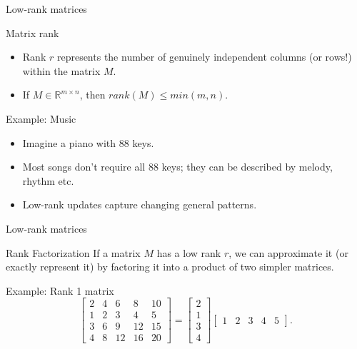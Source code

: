 \documentclass[24pt]{beamer}
\begin{document}
\begin{frame}{Low-rank matrices}
    \begin{block}{Matrix rank}
        \begin{itemize}
            \item Rank $r$ represents the number of genuinely independent columns (or rows!) within the matrix $M$. \item If $M \in \mathbb{R}^{m\times n}$, then $rank(M) \leq min(m, n)$.
        \end{itemize}
    \end{block}

      	\begin{exampleblock}{Example: Music}
       	\begin{itemize}
       		\item Imagine a piano with 88 keys.
       		\item Most songs don't require all 88 keys; they can be described by melody, rhythm etc.
       		\item Low-rank updates capture changing \alert{general patterns}.
       	\end{itemize}
   \end{exampleblock}
\end{frame}

\begin{frame}{Low-rank matrices}
    \begin{block}{Rank Factorization}
        If a matrix $M$ has a low rank $r$, we can approximate it (or
        exactly represent it) by factoring it into a product of two simpler
        matrices.
    \end{block}

    \begin{exampleblock}{Example: Rank 1 matrix}
        \[
        \begin{bmatrix}
            2 & 4 & 6 & 8 & 10\\
            1 & 2 & 3 & 4 & 5\\
            3 & 6 & 9 & 12 & 15\\
            4 & 8 & 12 & 16 & 20
        \end{bmatrix}
        =
        \begin{bmatrix}
            2\\
            1\\
            3\\
            4
        \end{bmatrix}
        \begin{bmatrix}
            1 & 2 & 3 & 4 & 5
        \end{bmatrix}.
        \]
    \end{exampleblock}
\end{frame}
\end{document}
